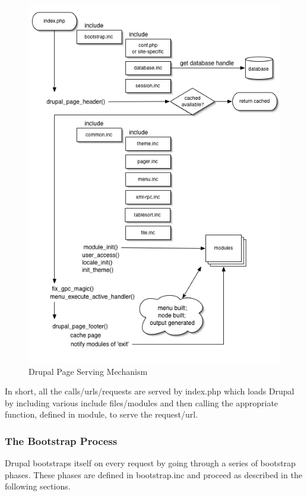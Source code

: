 \begin{figure}[H]
\centering
\includegraphics[width=14cm]{Chapter2/drupal_page_serving_mechanism.png}
\caption{Drupal Page Serving Mechanism}
\label{fig:drupal_page_serving_mechanism}
\end{figure}

In short, all the calls/urls/requests are served by index.php which loads Drupal by including various include files/modules and then calling the appropriate function, defined in module, to serve the request/url.

\subsubsection{The Bootstrap Process}

Drupal bootstraps itself on every request by going through a series of bootstrap phases. These phases are defined in bootstrap.inc and proceed as described in the following sections.

